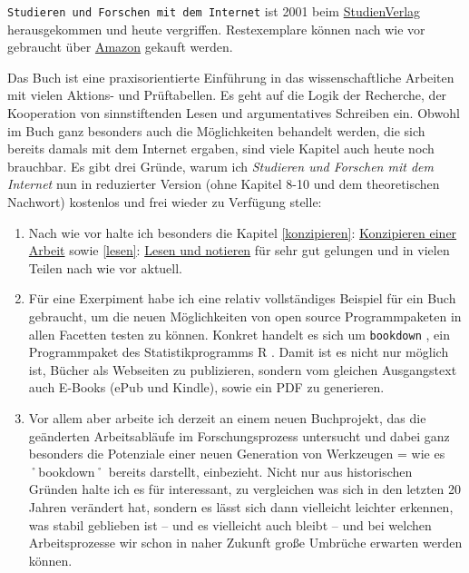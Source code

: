 \documentclass[]{book}
\providecommand{\tightlist}{%
  \setlength{\itemsep}{0pt}\setlength{\parskip}{0pt}}
\theoremstyle{definition}
\theoremstyle{definition}
\theoremstyle{definition}
\theoremstyle{remark}
\begin{document}
\texttt{Studieren\ und\ Forschen\ mit\ dem\ Internet} ist 2001 beim
\href{http://www.studienverlag.at/page.cfm?vpath=buecher/buchdetail\&bookclass=\&titnr=1319}{StudienVerlag}
herausgekommen und heute vergriffen. Restexemplare können nach wie vor
gebraucht über
\href{https://www.amazon.de/Studieren-Forschen-mit-dem-Internet/dp/3706513196/ref=sr_1_1?ie=UTF8\&qid=1508089811\&sr=8-1\&keywords=studieren+und+forschen+mit+dem+internet}{Amazon}
gekauft werden.

Das Buch \citep{Baumgartner_Payr_2001} ist eine praxisorientierte
Einführung in das wissenschaftliche Arbeiten mit vielen Aktions- und
Prüftabellen. Es geht auf die Logik der Recherche, der Kooperation von
sinnstiftenden Lesen und argumentatives Schreiben ein. Obwohl im Buch
ganz besonders auch die Möglichkeiten behandelt werden, die sich bereits
damals mit dem Internet ergaben, sind viele Kapitel auch heute noch
brauchbar. Es gibt drei Gründe, warum ich \emph{Studieren und Forschen
mit dem Internet} nun in reduzierter Version (ohne Kapitel 8-10 und dem
theoretischen Nachwort) kostenlos und frei wieder zu Verfügung stelle:

\begin{enumerate}
\def\labelenumi{\arabic{enumi}.}
\tightlist
\item
  Nach wie vor halte ich besonders die Kapitel \ref{konzipieren}:
  \protect\hyperlink{konzipieren}{Konzipieren einer Arbeit} sowie
  \ref{lesen}: \protect\hyperlink{lesen}{Lesen und notieren} für sehr
  gut gelungen und in vielen Teilen nach wie vor aktuell.
\item
  Für eine Exerpiment habe ich eine relativ vollständiges Beispiel für
  ein Buch gebraucht, um die neuen Möglichkeiten von open source
  Programmpaketen in allen Facetten testen zu können. Konkret handelt es
  sich um \texttt{bookdown} \citep{Xie_2016}, ein Programmpaket des
  Statistikprogramms R \citep{R-base}. Damit ist es nicht nur möglich
  ist, Bücher als Webseiten zu publizieren, sondern vom gleichen
  Ausgangstext auch E-Books (ePub und Kindle), sowie ein PDF zu
  generieren.
\item
  Vor allem aber arbeite ich derzeit an einem neuen Buchprojekt, das die
  geänderten Arbeitsabläufe im Forschungsprozess untersucht und dabei
  ganz besonders die Potenziale einer neuen Generation von Werkzeugen =
  wie es ˚bookdown˚ bereits darstellt, einbezieht. Nicht nur aus
  historischen Gründen halte ich es für interessant, zu vergleichen was
  sich in den letzten 20 Jahren verändert hat, sondern es lässt sich
  dann vielleicht leichter erkennen, was stabil geblieben ist -- und es
  vielleicht auch bleibt -- und bei welchen Arbeitsprozesse wir schon in
  naher Zukunft große Umbrüche erwarten werden können.
\end{enumerate}
\end{document}
